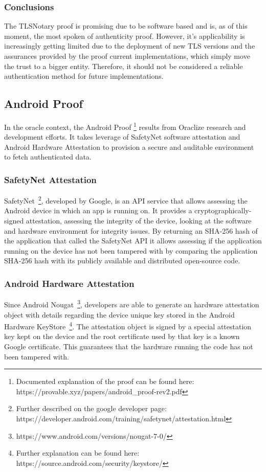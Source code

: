 \subsubsection{Conclusions}
The TLSNotary proof is promising due to be software based and is, as of this moment, the most spoken of authenticity proof. However, it's applicability is increasingly getting limited due to the deployment of new TLS versions and the assurances provided by the proof current implementations, which simply move the trust to a bigger entity. Therefore, it should not be considered a reliable authentication method for future implementations.

\subsection{Android Proof}

In the oracle context, the Android Proof \footnote{Documented explanation of the proof can be found here: https://provable.xyz/papers/android\_proof-rev2.pdf} results from Oraclize research and development efforts. It takes leverage of SafetyNet software attestation and Android Hardware Attestation to provision a secure and auditable environment to fetch authenticated data.

\subsubsection{SafetyNet Attestation}
SafetyNet~\footnote{Further described on the google developer page: https://developer.android.com/training/safetynet/attestation.html}, developed by Google, is an API service that allows assessing the Android device in which an app is running on. It provides a cryptographically-signed attestation, assessing the integrity of the device, looking at the software and hardware environment for integrity issues. By returning an SHA-256 hash of the application that called the SafetyNet API it allows assessing if the application running on the device has not been tampered with by comparing the application SHA-256 hash with its publicly available and distributed open-source code.

\subsubsection{Android Hardware Attestation}
Since Android Nougat~\footnote{https://www.android.com/versions/nougat-7-0/}, developers are able to generate an hardware attestation object with details regarding the device unique key stored in the Android Hardware KeyStore~\footnote{Further explanation can be found here: https://source.android.com/security/keystore/}. The attestation object is signed by a special attestation key kept on the device and the root certificate used by that key is a known Google certificate. This guarantees that the hardware running the code has not been tampered with.

